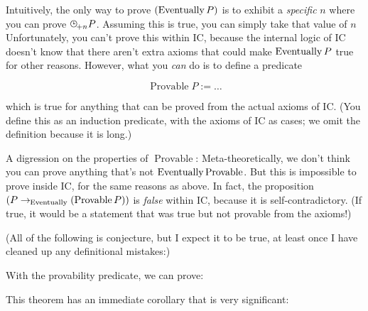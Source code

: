 \documentclass{article}
\begin{document}
  Intuitively, the only way to prove $(\operatorname{\mathrm{Eventually}} P)$ is to exhibit a \emph{specific} $n$ where you can prove $\clocksub{+n} P$. Assuming this is true, you can simply take that value of $n$ Unfortunately, you can't prove this within IC, because the internal logic of IC doesn't know that there aren't extra axioms that could make $\operatorname{\mathrm{Eventually}} P$ true for other reasons. However, what you \emph{can} do is to define a predicate
  
  \newcommand{\provable}{\operatorname{\mathrm{Provable}}}
  
  \[\provable P := \dots\]
  
  which is true for anything that can be proved from the actual axioms of IC. (You define this as an induction predicate, with the axioms of IC as cases; we omit the definition because it is long.)
  
  A digression on the properties of $\provable$: Meta-theoretically, we don't think you can prove anything that's not $\eventually \provable$. But this is impossible to prove inside IC, for the same reasons as above. In fact, the proposition $(P \implies \eventually (\provable P))$ is \emph{false} within IC, because it is self-contradictory. (If true, it would be a statement that was true but not provable from the axioms!)
  
  
  (All of the following is conjecture, but I expect it to be true, at least once I have cleaned up any definitional mistakes:)
  
  With the provability predicate, we can prove:
  
  
  This theorem has an immediate corollary that is very significant:
  
\fi

\end{document}
